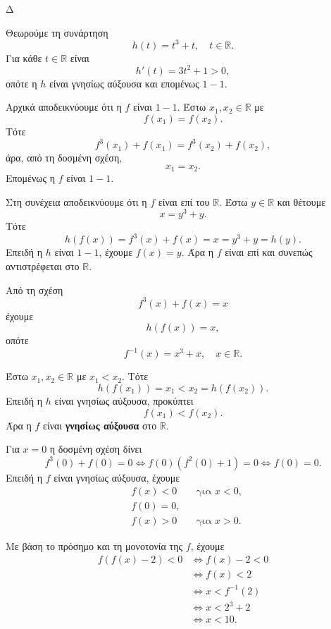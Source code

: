 \begin{thema}{Δ}
\begin{erwthma}
\item Θεωρούμε τη συνάρτηση
\[
h(t)=t^3+t,\quad t\in\mathbb{R}.
\]
Για κάθε $t\in\mathbb{R}$ είναι
\[
h'(t)=3t^2+1>0,
\]
οπότε η $h$ είναι γνησίως αύξουσα και επομένως $1-1$.

Αρχικά αποδεικνύουμε ότι η $f$ είναι $1-1$. Έστω $x_1,x_2\in\mathbb{R}$ με
\[
f(x_1)=f(x_2).
\]
Τότε
\[
f^3(x_1)+f(x_1)=f^3(x_2)+f(x_2),
\]
άρα, από τη δοσμένη σχέση,
\[
x_1=x_2.
\]
Επομένως η $f$ είναι $1-1$.

Στη συνέχεια αποδεικνύουμε ότι η $f$ είναι επί του $\mathbb{R}$. Έστω $y\in\mathbb{R}$ και θέτουμε
\[
x=y^3+y.
\]
Τότε
\[
h(f(x))=f^3(x)+f(x)=x=y^3+y=h(y).
\]
Επειδή η $h$ είναι $1-1$, έχουμε $f(x)=y$. Άρα η $f$ είναι επί και συνεπώς αντιστρέφεται στο $\mathbb{R}$.

Από τη σχέση
\[
f^3(x)+f(x)=x
\]
έχουμε
\[
h(f(x))=x,
\]
οπότε
\[
{f^{-1}(x)=x^3+x},\quad x\in\mathbb{R}.
\]

\item Έστω $x_1,x_2\in\mathbb{R}$ με $x_1<x_2$. Τότε
\[
h(f(x_1))=x_1<x_2=h(f(x_2)).
\]
Επειδή η $h$ είναι γνησίως αύξουσα, προκύπτει
\[
f(x_1)<f(x_2).
\]
Άρα η $f$ είναι \textbf{γνησίως αύξουσα} στο $\mathbb{R}$.

Για $x=0$ η δοσμένη σχέση δίνει
\[
f^3(0)+f(0)=0
\Leftrightarrow
f(0)\left(f^2(0)+1\right)=0
\Leftrightarrow
f(0)=0.
\]
Επειδή η $f$ είναι γνησίως αύξουσα, έχουμε
\[
{
\begin{aligned}
&f(x)<0 &&\text{για }x<0,\\
&f(0)=0,\\
&f(x)>0 &&\text{για }x>0.
\end{aligned}}
\]

Με βάση το πρόσημο και τη μονοτονία της $f$, έχουμε
\begin{align*}
f(f(x)-2)<0
&\Leftrightarrow f(x)-2<0\\
&\Leftrightarrow f(x)<2\\
&\Leftrightarrow x<f^{-1}(2)\\
&\Leftrightarrow x<2^3+2\\
&\Leftrightarrow {x<10}.
\end{align*}


\end{erwthma}
\end{thema}
